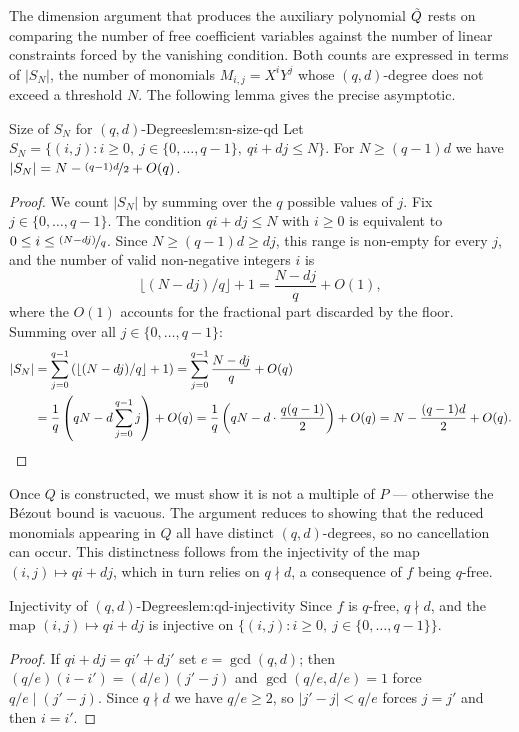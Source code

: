 The dimension argument that produces the auxiliary polynomial $\tilde{Q}$ rests on comparing the number of free coefficient variables against the number of linear constraints forced by the vanishing condition. Both counts are expressed in terms of $|S_N|$, the number of monomials $M_{i,j}=X^iY^j$ whose $(q,d)$-degree does not exceed a threshold $N$. The following lemma gives the precise asymptotic.
\begin{lemma}{Size of $S_N$ for $(q,d)$-Degrees}{lem:sn-size-qd}
  Let $S_N=\{(i,j): i\geq 0,\ j\in\{0,\dots,q-1\},\ qi+dj\leq N\}$. For $N\geq(q-1)d$ we have $|S_N|=N-\nicefrac{(q-1)d}{2}+O(q)$.
\end{lemma}
\begin{proof}
  We count $|S_N|$ by summing over the $q$ possible values of $j$. Fix $j\in\{0,\dots,q-1\}$. The condition $qi+dj\leq N$ with $i\geq 0$ is equivalent to $0\leq i\leq\nicefrac{(N-dj)}{q}$. Since $N\geq (q-1)d\geq dj$, this range is non-empty for every $j$, and the number of valid non-negative integers $i$ is
  $$\lfloor(N-dj)/q\rfloor+1 = \frac{N-dj}{q}+O(1),$$
  where the $O(1)$ accounts for the fractional part discarded by the floor. Summing over all $j\in\{0,\dots,q-1\}$:
  \begin{align*}
    |S_N| &= \sum_{j=0}^{q-1}\left(\lfloor(N-dj)/q\rfloor+1\right)
    = \sum_{j=0}^{q-1}\frac{N-dj}{q}+O(q)\\
    &= \frac{1}{q}\left(qN - d\sum_{j=0}^{q-1}j\right)+O(q)
    = \frac{1}{q}\left(qN-d\cdot\frac{q(q-1)}{2}\right)+O(q)
    = N-\frac{(q-1)d}{2}+O(q).\qedhere
  \end{align*}
\end{proof}

Once $Q$ is constructed, we must show it is not a multiple of $P$ --- otherwise the B\'{e}zout bound is vacuous. The argument reduces to showing that the reduced monomials appearing in $Q$ all have distinct $(q,d)$-degrees, so no cancellation can occur. This distinctness follows from the injectivity of the map $(i,j)\mapsto qi+dj$, which in turn relies on $q\nmid d$, a consequence of $f$ being $q$-free.
\begin{lemma}{Injectivity of $(q,d)$-Degrees}{lem:qd-injectivity}
  Since $f$ is $q$-free, $q\nmid d$, and the map $(i,j)\mapsto qi+dj$ is injective on $\{(i,j): i\geq 0,\ j\in\{0,\dots,q-1\}\}$.
\end{lemma}
\begin{proof}
  If $qi+dj=qi'+dj'$ set $e=\gcd(q,d)$; then $(q/e)(i-i')=(d/e)(j'-j)$ and $\gcd(q/e,d/e)=1$ force $q/e\mid(j'-j)$. Since $q\nmid d$ we have $q/e\geq 2$, so $|j'-j|<q/e$ forces $j=j'$ and then $i=i'$.
\end{proof}


